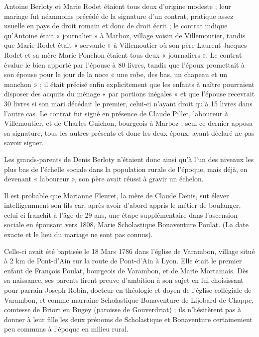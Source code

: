 \documentclass[11pt,a4paper]{report}
\begin{document}
Antoine Berloty et Marie Rodet étaient tous deux d'origine modeste ; leur mariage fut néanmoins précédé de la signature d'un contrat, pratique assez usuelle en pays de droit romain et donc de droit écrit ; le contrat indique qu'Antoine était « journalier » à Marboz, village voisin de Villemoutier, tandis que Marie Rodet était « servante » à Villemoutier où son père Laurent Jacques Rodet et sa mère Marie Ponchon étaient tous deux « journaliers ». Le contrat évalue le bien apporté par l'épouse à 80 livres, tandis que l'époux promettait à son épouse pour le jour de la noce « une robe, des bas, un chapeau et un manchon » ; il était précisé enfin explicitement que les enfants à naître pourraient disposer des acquits du ménage « par portions inégales » et que l'épouse recevrait 30 livres si son mari décédait le premier, celui-ci n'ayant droit qu'à 15 livres dans l'autre cas. Le contrat fut signé en présence de Claude Pillet, laboureur à Villemoutier, et de Charles Guichon, bourgeois à Marboz ; seul ce dernier apposa sa signature, tous les autres présents et donc les deux époux, ayant déclaré ne pas savoir signer.


Les grands-parents de Denis Berloty n'étaient donc ainsi qu'à l'un des niveaux les plus bas de l'échelle sociale dans la population rurale de l'époque, mais déjà, en devenant « laboureur », son père avait réussi à gravir un échelon.

Il est probable que Marianne Fleuret, la mère de Claude Denis, sut élever intelligemment son fils car, après avoir d'abord appris le métier de boulanger, celui-ci franchit à l'âge de 29 ans, une étape supplémentaire dans l'ascension sociale en épousant vers 1808, Marie Scholastique Bonaventure Poulat. (La date exacte et le lieu du mariage ne sont pas connus).

Celle-ci avait été baptisée le 18 Mars 1786 dans l'église de Varambon, village situé à 2 km de Pont-d'Ain sur la route de Pont-d'Ain à Lyon. Elle était le premier enfant de François Poulat, bourgeois de Varambon, et de Marie Mortamais. Dès sa naissance, ses parents firent preuve d'ambition à son sujet en lui choisissant pour parrain Joseph Robin, docteur en théologie et doyen de l'église collégiale de Varambon, et comme marraine Scholastique Bonaventure de Lijobard de Chappe, comtesse de Briort en Bugey (paroisse de Gouverdriat) ; ils n'hésitèrent pas à donner à leur fille les deux prénoms de Scholastique et Bonaventure certainement peu communs à l'époque en milieu rural.
\end{document}
